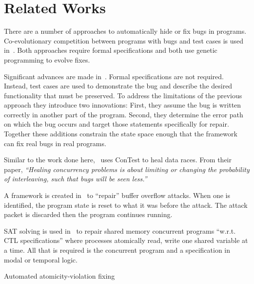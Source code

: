 \section{Related Works}
\label{sec:related_works}

There are a number of approaches to automatically hide or fix bugs in programs.
Co-evolutionary competition between programs with bugs and test cases is used
in~\cite{AY08, Arc08, WT10}. Both approaches require formal specifications and
both use genetic programming to evolve fixes.

Significant advances are made in~\cite{FNWG09, WNLF09, NWLF09, WFGN10, GNFW11,
LDFW12}. Formal specifications are not required. Instead, test cases are used
to demonstrate the bug and describe the desired functionality that must be
preserved. To address the limitations of the previous approach they introduce
two innovations: First, they assume the bug is written correctly in another
part of the program. Second, they determine the error path on which the bug
occurs and target those statements specifically for repair. Together these
additions constrain the state space enough that the framework can fix real bugs
in real programs.

Similar to the work done here,~\cite{KLT+07, LVK08} uses ConTest to heal data
races. From their paper, \textit{``Healing concurrency problems is about
limiting or changing the probability of interleaving, such that bugs will be
seen less.''}

A framework is created in~\cite{CB05} to ``repair'' buffer overflow attacks.
When one is identified, the program state is reset to what it was before the
attack. The attack packet is discarded then the program continues running.

SAT solving is used in~\cite{AY07}  to repair shared memory concurrent programs
``w.r.t. CTL specifications'' where processes atomically read, write one shared
variable at a time. All that is required is the concurrent program and a
specification in modal or temporal logic.

Automated atomicity-violation fixing~\cite{JSZL+11}
